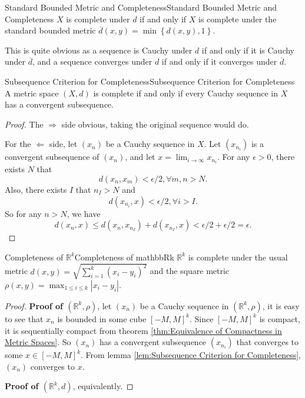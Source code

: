\documentclass[../main.tex]{subfiles}
\begin{document}
\begin{proposition}{Standard Bounded Metric and Completeness}{Standard Bounded Metric and Completeness}
	$X$ is complete under $d$ if and only if $X$ is complete under the standard bounded metric $\overline{d}(x,y) = \min \left\{d(x,y),1  \right\}$.
\end{proposition}
This is quite obvious as a sequence is Cauchy under $d$ if and only if it is Cauchy under $\overline{d}$, and a sequence converges under $d$ if and only if it converges under $\overline{d}$.

\begin{lemma}{Subsequence Criterion for Completeness}{Subsequence Criterion for Completeness}
	A metric space $(X,d)$ is complete if and only if every Cauchy sequence in $X$ has a convergent subsequence.
\end{lemma}
\begin{proof}
The $\Rightarrow$ side obvious, taking the original sequence would do.

For the $\Leftarrow$ side, let $(x_n)$ be a Cauchy sequence in $X$. Let $(x_{n_i})$ is a convergent subsequence of $(x_n)$, and let $x = \lim_{i \to \infty} x_{n_i}$. For any $\epsilon > 0$, there exists $N$ that
\begin{equation*}
	d(x_n,x_m) < \epsilon/2, \forall m,n > N.
\end{equation*}
Also, there exists $I$ that $n_I>N$ and
\begin{equation*}
	d(x_{n_i}, x) < \epsilon/2, \forall i > I.
\end{equation*}
So for any $n > N$, we have
\begin{equation*}
	d(x_n, x) \leq d(x_n, x_{n_I}) + d(x_{n_I}, x) < \epsilon/2 + \epsilon/2 = \epsilon.
\end{equation*}
\end{proof}

\begin{theorem}{Completeness of $\mathbb{R}^k$}{Completeness of mathbbRk}
	$\mathbb{R}^k$ is complete under the usual metric $d(x,y) = \sqrt{\sum_{i=1}^k (x_i - y_i)^2}$ and the square metric $\rho(x,y) = \max_{1 \leq i \leq k} |x_i - y_i|$.
\end{theorem}
\begin{proof}
	\textbf{Proof of $(\mathbb{R}^k,\rho)$}, let $(x_n)$ be a Cauchy sequence in $(\mathbb{R}^k,\rho)$, it is easy to see that $x_n$ is bounded in some cube $[-M,M]^k$. Since $[-M,M]^k$ is compact, it is sequentially compact from theorem \ref{thm:Equivalence of Compactness in Metric Spaces}. So $(x_n)$ has a convergent subsequence $(x_{n_i})$ that converges to some $x \in [-M,M]^k$. From lemma \ref{lem:Subsequence Criterion for Completeness}, $(x_n)$ converges to $x$.

	\textbf{Proof of $(\mathbb{R}^k,d)$}, equivalently.
\end{proof}
\end{document}
